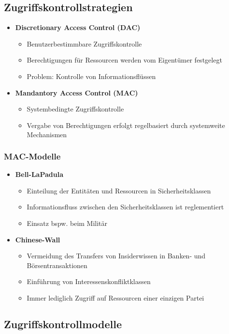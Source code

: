 \subsection{Zugriffskontrollstrategien}
\begin{itemize}
	\item \textbf{Discretionary Access Control (DAC)}
	\begin{itemize}
		\item Benutzerbestimmbare Zugriffskontrolle
		\item Berechtigungen für Ressourcen werden vom Eigentümer festgelegt
		\item Problem: Kontrolle von Informationsflüssen
	\end{itemize}
	\item \textbf{Mandantory Access Control (MAC)}
	\begin{itemize}
		\item Systembedingte Zugriffskontrolle
		\item Vergabe von Berechtigungen erfolgt regelbasiert durch systemweite Mechanismen
	\end{itemize}
\end{itemize}

\subsubsection{MAC-Modelle}
\begin{itemize}
	\item \textbf{Bell-LaPadula}
	\begin{itemize}
		\item Einteilung der Entitäten und Ressourcen in Sicherheitsklassen
		\item Informationsfluss zwischen den Sicherheitsklassen ist reglementiert
		\item Einsatz bspw. beim Militär
	\end{itemize}
	\item \textbf{Chinese-Wall}
	\begin{itemize}
		\item Vermeidung des Transfers von Insiderwissen in Banken- und Börsentransaktionen
		\item Einführung von Interessenskonfliktklassen
		\item Immer lediglich Zugriff auf Ressourcen einer einzigen Partei
	\end{itemize}
\end{itemize}


\subsection{Zugriffskontrollmodelle}

